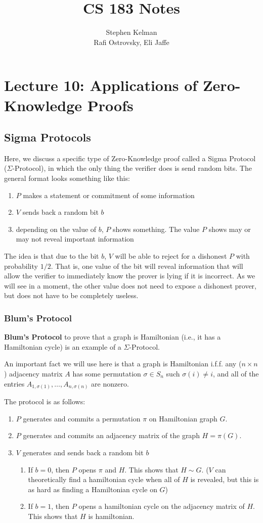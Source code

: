\documentclass[11pt]{article}
\title{CS 183 Notes}
\author{Stephen Kelman\\ Rafi Ostrovsky, Eli Jaffe}
\begin{document}
\section{Lecture 10: Applications of Zero-Knowledge Proofs}

\subsection{Sigma Protocols}
Here, we discuss a specific type of Zero-Knowledge proof called a Sigma Protocol (\(\Sigma\)-Protocol), in which the only thing the verifier does is send random bits. The general format looks something like this:
\begin{enumerate}
\item \(P\) makes a statement or commitment of some information
\item \(V\) sends back a random bit \(b\)
\item depending on the value of \(b\), \(P\) shows something. The value \(P\) shows may or may not reveal important information
\end{enumerate}

The idea is that due to the bit \(b\), \(V\) will be able to reject for a dishonest \(P\) with probability \(1/2\). That is, one value of the bit will reveal information that will allow the verifier to immediately know the prover is lying if it is incorrect. As we will see in a moment, the other value does not need to expose a dishonest prover, but does not have to be completely useless.\medskip


\subsubsection{Blum's Protocol}
\textbf{Blum's Protocol} to prove that a graph is Hamiltonian (i.e., it has a Hamiltonian cycle) is an example of a \(\Sigma\)-Protocol. \smallskip

An important fact we will use here is that a graph is Hamiltonian i.f.f. any (\(n\times n\)) adjacency matrix \(A\) has some permutation \(\sigma\in S_n\) such \(\sigma(i)\ne i\), and all of the entries \(A_{1,\sigma(1)},\ldots,A_{n,\sigma(n)}\) are nonzero.\medskip

The protocol is as follows:
\begin{enumerate}
\item \(P\) generates and commits a permutation \(\pi\) on Hamiltonian graph \(G\).
\item \(P\) generates and commits an adjacency matrix of the graph \(H=\pi(G)\).
\item \(V\) generates and sends back a random bit \(b\)
\begin{enumerate}
\item If \(b=0\), then \(P\) opens \(\pi\) and \(H\). This shows that \(H\sim G\). (\(V\) can theoretically find a hamiltonian cycle when all of \(H\) is revealed, but this is as hard as finding a Hamiltonian cycle on \(G\))
\item If \(b=1\), then \(P\) opens a hamiltonian cycle on the adjacency matrix of \(H\). This shows that \(H\) is hamiltonian.
\end{enumerate}
\end{enumerate}
\end{document}
